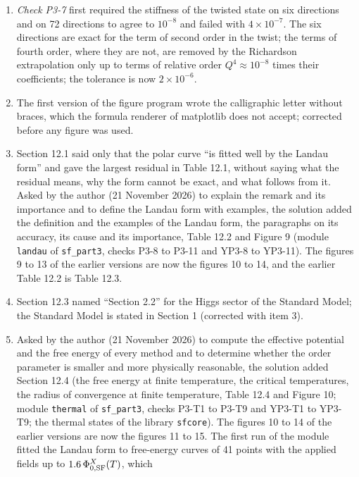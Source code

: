 \documentclass[
  10pt,
]{article}
\providecommand{\tightlist}{%
  \setlength{\itemsep}{0pt}\setlength{\parskip}{0pt}}
\begin{document}
\begin{enumerate}
\def\labelenumi{\arabic{enumi}.}
\tightlist
\item
  \emph{Check P3-7} first required the stiffness of the twisted state on
  six directions and on 72 directions to agree to \(10^{-8}\) and failed
  with \(4\times10^{-7}\). The six directions are exact for the term of
  second order in the twist; the terms of fourth order, where they are
  not, are removed by the Richardson extrapolation only up to terms of
  relative order \(Q^4\approx10^{-8}\) times their coefficients; the
  tolerance is now \(2\times10^{-6}\).
\item
  The first version of the figure program wrote the calligraphic letter
  without braces, which the formula renderer of matplotlib does not
  accept; corrected before any figure was used.
\item
  Section 12.1 said only that the polar curve ``is fitted well by the
  Landau form'' and gave the largest residual in Table 12.1, without
  saying what the residual means, why the form cannot be exact, and what
  follows from it. Asked by the author (21 November 2026) to explain the
  remark and its importance and to define the Landau form with examples,
  the solution added the definition and the examples of the Landau form,
  the paragraphs on its accuracy, its cause and its importance, Table
  12.2 and Figure 9 (module \texttt{landau} of \texttt{sf\_part3},
  checks P3-8 to P3-11 and YP3-8 to YP3-11). The figures 9 to 13 of the
  earlier versions are now the figures 10 to 14, and the earlier Table
  12.2 is Table 12.3.
\item
  Section 12.3 named ``Section 2.2'' for the Higgs sector of the
  Standard Model; the Standard Model is stated in Section 1 (corrected
  with item 3).
\item
  Asked by the author (21 November 2026) to compute the effective
  potential and the free energy of every method and to determine whether
  the order parameter is smaller and more physically reasonable, the
  solution added Section 12.4 (the free energy at finite temperature,
  the critical temperatures, the radius of convergence at finite
  temperature, Table 12.4 and Figure 10; module \texttt{thermal} of
  \texttt{sf\_part3}, checks P3-T1 to P3-T9 and YP3-T1 to YP3-T9; the
  thermal states of the library \texttt{sfcore}). The figures 10 to 14
  of the earlier versions are now the figures 11 to 15. The first run of
  the module fitted the Landau form to free-energy curves of 41 points
  with the applied fields up to \(1.6\,\Phi^X_{0,{\rm SF}}(T)\), which

\end{enumerate}
\end{document}
